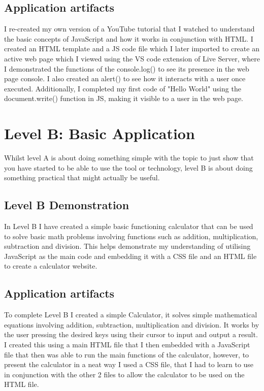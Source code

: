 \documentclass[a4paper, 11pt]{report}
\begin{document}
\cite{LevelA1}
\cite{LevelA2}
\cite{LevelA3}
\cite{LevelA4}
\cite{LevelA5}

\subsection{Application artifacts}
I re-created my own version of a YouTube tutorial that I watched to understand the basic concepts of JavaScript and how it works in conjunction with HTML. I created an HTML template and a JS code file which I later imported to create an active web page which I viewed using the VS code extension of Live Server, where I demonstrated the functions of the console.log() to see its presence in the web page console. I also created an alert() to see how it interacts with a user once executed. Additionally, I completed my first code of "Hello World" using the document.write() function in JS, making it visible to a user in the web page.   



\newpage
\section{Level B: Basic Application}

Whilst level A is about doing something simple with the topic to just show that you have started to be able to use the tool or technology, level B is about doing something practical that might actually be useful.

\subsection{Level B Demonstration}

In Level B I have created a simple basic functioning calculator that can be used to solve basic math problems involving functions such as addition, multiplication, subtraction and division. This helps demonstrate my understanding of utilising JavaScript as the main code and embedding it with a CSS file and an HTML file to create a calculator website. 

\subsection{Application artifacts}

To complete Level B I created a simple Calculator, it solves simple mathematical equations involving addition, subtraction, multiplication and division. It works by the user pressing the desired keys using their cursor to input and output a result. I created this using a main HTML file that I then embedded with a JavaScript file that then was able to run the main functions of the calculator, however, to present the calculator in a neat way I used a CSS file, that I had to learn to use in conjunction with the other 2 files to allow the calculator to be used on the HTML file. 
\end{document}
